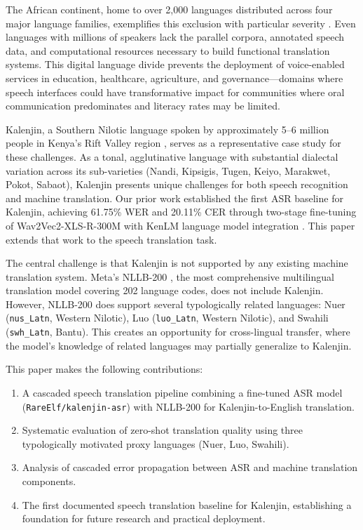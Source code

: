 \documentclass[conference]{IEEEtran}
\begin{document}
The African continent, home to over 2,000 languages distributed across four major language families, exemplifies this exclusion with particular severity \cite{adelani2022masakhaner}. Even languages with millions of speakers lack the parallel corpora, annotated speech data, and computational resources necessary to build functional translation systems. This digital language divide prevents the deployment of voice-enabled services in education, healthcare, agriculture, and governance---domains where speech interfaces could have transformative impact for communities where oral communication predominates and literacy rates may be limited.

Kalenjin, a Southern Nilotic language spoken by approximately 5--6 million people in Kenya's Rift Valley region \cite{toweett1979study}, serves as a representative case study for these challenges. As a tonal, agglutinative language with substantial dialectal variation across its sub-varieties (Nandi, Kipsigis, Tugen, Keiyo, Marakwet, Pokot, Sabaot), Kalenjin presents unique challenges for both speech recognition and machine translation. Our prior work established the first ASR baseline for Kalenjin, achieving 61.75\% WER and 20.11\% CER through two-stage fine-tuning of Wav2Vec2-XLS-R-300M with KenLM language model integration \cite{baevski2020wav2vec, babu2022xls, heafield2011kenlm}. This paper extends that work to the speech translation task.

The central challenge is that Kalenjin is not supported by any existing machine translation system. Meta's NLLB-200 \cite{nllb2022}, the most comprehensive multilingual translation model covering 202 language codes, does not include Kalenjin. However, NLLB-200 does support several typologically related languages: Nuer (\texttt{nus\_Latn}, Western Nilotic), Luo (\texttt{luo\_Latn}, Western Nilotic), and Swahili (\texttt{swh\_Latn}, Bantu). This creates an opportunity for cross-lingual transfer, where the model's knowledge of related languages may partially generalize to Kalenjin.

This paper makes the following contributions:

\begin{enumerate}
    \item A cascaded speech translation pipeline combining a fine-tuned ASR model (\texttt{RareElf/kalenjin-asr}) with NLLB-200 for Kalenjin-to-English translation.
    \item Systematic evaluation of zero-shot translation quality using three typologically motivated proxy languages (Nuer, Luo, Swahili).
    \item Analysis of cascaded error propagation between ASR and machine translation components.
    \item The first documented speech translation baseline for Kalenjin, establishing a foundation for future research and practical deployment.
\end{enumerate}
\end{document}
